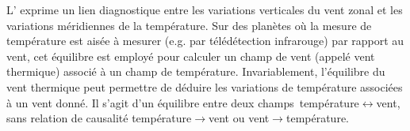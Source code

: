 \sk
L' exprime un lien diagnostique entre les variations verticales du vent zonal et les variations méridiennes de la température. Sur des planètes où la mesure de température est aisée à mesurer (e.g. par télédétection infrarouge) par rapport au vent, cet équilibre est employé pour calculer un champ de vent (appelé vent thermique) associé à un champ de température. Invariablement, l'équilibre du vent thermique peut permettre de déduire les variations de température associées à un vent donné. Il s'agit d'un équilibre entre deux champs~température$\leftrightarrow$vent, sans relation de causalité température$\rightarrow$vent ou vent$\rightarrow$température.

